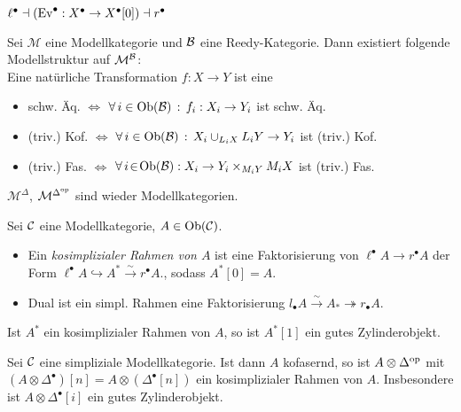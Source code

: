 \documentclass{cheat-sheet}
\newcommand{\ModC}{\mathcal{M}} %
\begin{document}
\begin{bem}
  $\ell^\bullet \dashv (\text{Ev}^\bullet : X^\bullet \to X^\bullet [0]) \dashv r^\bullet$
\end{bem}

\begin{satz}
  Sei $\ModC$ eine Modellkategorie und $\mathcal{B}$ eine Reedy-Kategorie.
  Dann existiert folgende Modellstruktur auf $\ModC^\Bat$: \\
  Eine natürliche Transformation $f : X \to Y$ ist eine
  \begin{itemize}
    \item schw. Äq. $\iff$ $\forall \, {i \in \operatorname{Ob}(\mathcal{B})} \,:\, f_i : X_i \to Y_i$ ist schw. Äq.
    \item (triv.) Kof. $\iff$ $\forall \, {i \in \operatorname{Ob}(\mathcal{B})} \,:\, X_i \cup_{L_i X} L_i Y \to Y_i$ ist (triv.) Kof.
    \item (triv.) Fas. $\iff$ $\forall \, {i \!\in\! \operatorname{Ob}(\mathcal{B})\!} \,:\,\! X_i \to Y_i \times_{M_i Y} M_i X$ ist (triv.) Fas.
  \end{itemize}
\end{satz}

\begin{bsp}
  $\ModC^\Delta$, $\ModC^{\Delta^\op}$ sind wieder Modellkategorien.
\end{bsp}

\begin{defn}
  Sei $\mathcal{C}$ eine Modellkategorie, $A \in \operatorname{Ob}(\mathcal{C})$.
  \begin{itemize}
    \item Ein \emph{kosimplizialer Rahmen von $A$} ist eine Faktorisierung von $\ell^\bullet A \to r^\bullet A$ der Form $\ell^\bullet A \hookrightarrow A^* \xrightarrow{{\sim}} r^\bullet A$., sodass $A^* [0] = A$.
    \item Dual ist ein simpl. Rahmen eine Faktorisierung $l_\bullet A \xrightarrow{{\sim}} A_* \twoheadrightarrow r_\bullet A$.
  \end{itemize}
\end{defn}

\begin{bem}
  Ist $A^*$ ein kosimplizialer Rahmen von $A$, so ist $A^*[1]$ ein gutes Zylinderobjekt.
\end{bem}

\begin{bsp}
  Sei $\mathcal{C}$ eine simpliziale Modellkategorie.
  Ist dann $A$ kofasernd, so ist $A \otimes \Delta^{\mathrm{op}}$ mit $(A \otimes \Delta^\bullet)[n] = A \otimes (\Delta^\bullet [n])$ ein kosimplizialer Rahmen von $A$.
  Insbesondere ist $A \otimes \Delta^\bullet [i]$ ein gutes Zylinderobjekt.
\end{bsp}
\end{document}
